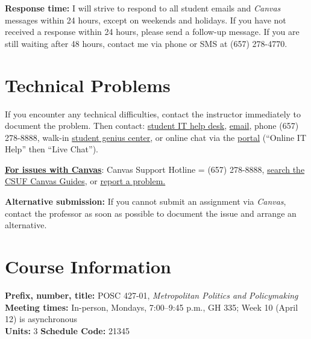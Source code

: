 \documentclass[12pt]{article}
\begin{document}
\vspace{0.5em}
\noindent \textbf{Response time:} I will strive to respond to all student emails and \emph{Canvas} messages within 24 hours, except on weekends and holidays. If you have not received a response within 24 hours, please send a follow-up message. If you are still waiting after 48 hours, contact me via phone or SMS at (657) 278-4770.

\section*{Technical Problems}

If you encounter any technical difficulties, contact the instructor immediately to document the problem. Then contact: \href{http://www.fullerton.edu/it/students/helpdesk/index.php}{student IT help desk}, \href{mailto:StudentITHelpDesk@fullerton.edu}{email}, phone (657) 278-8888, walk-in \href{http://www.fullerton.edu/it/students/sgc/index.php}{student genius center}, or online chat via the \href{http://my.fullerton.edu}{portal} (``Online IT Help'' then ``Live Chat'').

\vspace{0.5em}
\noindent \textbf{\underline{For issues with Canvas}}: Canvas Support Hotline = (657) 278-8888, \href{https://canvashelp.fullerton.edu/}{search the CSUF Canvas Guides}, or \href{https://titans.service-now.com/sp?id=sc_cat_item&sys_id=f88efe80ebea6a10fb7cfcffcad0cdc6&subject=Canvas}{report a problem.}

\vspace{0.5em}
\noindent \textbf{Alternative submission:} If you cannot submit an assignment via \emph{Canvas}, contact the professor as soon as possible to document the issue and arrange an alternative.

\section*{Course Information}
\noindent \textbf{Prefix, number, title:} POSC 427-01, \textit{Metropolitan Politics and Policymaking} \\
\noindent \textbf{Meeting times:} In-person, Mondays, 7:00--9:45 p.m., GH 335; Week 10 (April 12) is asynchronous \\
\noindent \textbf{Units:} 3 \quad \textbf{Schedule Code:} 21345
\end{document}
